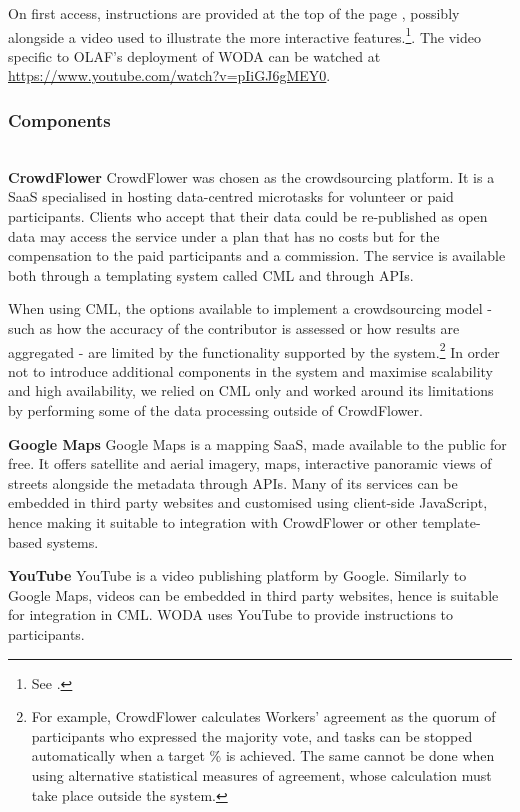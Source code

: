 On first access, instructions are provided at the top of the page , possibly alongside a video used to illustrate the more interactive features.\footnote{See \screenshotwithvideourl.}. The video specific to OLAF's deployment of WODA can be watched at \url{https://www.youtube.com/watch?v=pIiGJ6gMEY0}.

\subsubsection{Components} \leavevmode \\ %

\textbf{CrowdFlower} CrowdFlower was chosen as the crowdsourcing platform. It is a SaaS specialised in hosting data-centred microtasks for volunteer or paid participants. Clients who accept that their data could be re-published as open data may access the service under a plan that has no costs but for the compensation to the paid participants and a commission. The service is available both through a templating system called CML and through APIs. 

When using CML, the options available to implement a crowdsourcing model - such as how the accuracy of the contributor is assessed or how results are aggregated - are limited by the functionality supported by the system.\footnote{For example, CrowdFlower calculates Workers' agreement as the quorum of participants who expressed the majority vote, and tasks can be stopped automatically when a target \% is achieved. The same cannot be done when using alternative statistical measures of agreement, whose calculation must take place outside the system.} In order not to introduce additional components in the system and maximise scalability and high availability, we relied on CML only and worked around its limitations by performing some of the data processing outside of CrowdFlower. 

\textbf{Google Maps} Google Maps is a mapping SaaS, made available to the public for free. It offers satellite and aerial imagery, maps, interactive panoramic views of streets alongside the metadata through APIs. Many of its services can be embedded in third party websites and customised using client-side JavaScript, hence making it suitable to integration with CrowdFlower or other template-based systems. 

\textbf{YouTube} YouTube is a video publishing platform by Google. Similarly to Google Maps, videos can be embedded in third party websites, hence is suitable for integration in CML. WODA uses YouTube to provide instructions to participants.  

